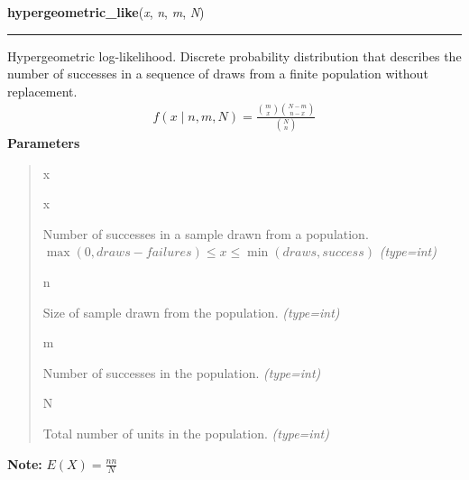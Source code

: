 \hspace{.8\funcindent}\begin{boxedminipage}{\funcwidth}

    \raggedright \textbf{hypergeometric\_like}(\textit{x}, \textit{n}, \textit{m}, \textit{N})

    \vspace{-1.5ex}

    \rule{\textwidth}{0.5\fboxrule}
\setlength{\parskip}{2ex}

Hypergeometric log-likelihood. Discrete probability distribution that
describes the number of successes in a sequence of draws from a finite
population without replacement.
\begin{equation*}\begin{split}f(x \mid n, m, N) = \frac{\binom{m}{x}\binom{N-m}{n-x}}{\binom{N}{n}}\end{split}\end{equation*}\setlength{\parskip}{1ex}
      \textbf{Parameters}
      \vspace{-1ex}

      \begin{quote}
        \begin{Ventry}{x}

          \item[x]


Number of successes in a sample drawn from a population.
$\max(0, draws-failures) \leq x \leq \min(draws, success)$
            {\it (type=int)}

          \item[n]


Size of sample drawn from the population.
            {\it (type=int)}

          \item[m]


Number of successes in the population.
            {\it (type=int)}

          \item[N]


Total number of units in the population.
            {\it (type=int)}

        \end{Ventry}

      \end{quote}

\textbf{Note:} 
$E(X) = \frac{n n}{N}$


    \end{boxedminipage}

